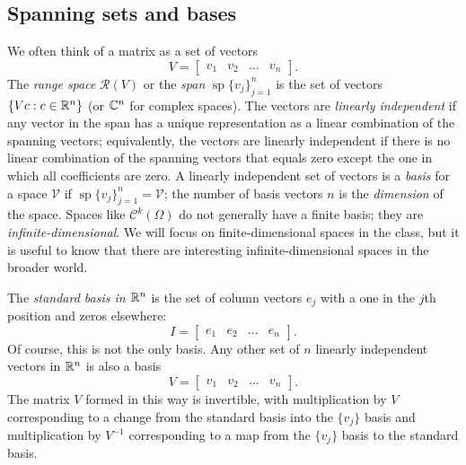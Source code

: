 \documentclass[12pt, leqno]{article} %
\begin{document}
\subsection{Spanning sets and bases}

We often think of a matrix as a set of vectors
\[
  V = \begin{bmatrix} v_1 & v_2 & \ldots & v_n \end{bmatrix}.
\]
The {\em range space} $\mathcal{R}(V)$ or the {\em span}
$\operatorname{sp}\{ v_j \}_{j=1}^n$ is the set of vectors
$\{ V c : c \in \mathbb{R}^n \}$ (or $\mathbb{C}^n$
for complex spaces).  The vectors are {\em linearly independent}
if any vector in the span has a unique representation as a linear
combination of the spanning vectors; equivalently, the vectors are
linearly independent if there is no linear combination of the
spanning vectors that equals zero except the one in which all
coefficients are zero.  A linearly independent set of vectors is
a {\em basis} for a space $\mathcal{V}$ if
$\operatorname{sp}\{v_j\}_{j=1}^n = \mathcal{V}$; the number of
basis vectors $n$ is the {\em dimension} of the space.  Spaces
like $\mathcal{C}^k(\Omega)$ do not generally have a finite basis;
they are {\em infinite-dimensional}.  We will focus on
finite-dimensional spaces in the class, but it is useful to know
that there are interesting infinite-dimensional spaces in the
broader world.

The {\em standard basis in $\mathbb{R}^n$} is the set of column vectors
$e_j$ with a one in the $j$th position and zeros elsewhere:
\[
  I = \begin{bmatrix} e_1 & e_2 & \ldots & e_n \end{bmatrix}.
\]
Of course, this is not the only basis.  Any other set of $n$ linearly
independent vectors in $\mathbb{R}^n$ is also a basis
\[
  V = \begin{bmatrix} v_1 & v_2 & \ldots & v_n \end{bmatrix}.
\]
The matrix $V$ formed in this way is invertible, with multiplication by $V$
corresponding to a change from the standard basis into the $\{v_j\}$ basis and
multiplication by $V^{-1}$ corresponding to a map from the $\{v_j\}$ basis to
the standard basis.
\end{document}
